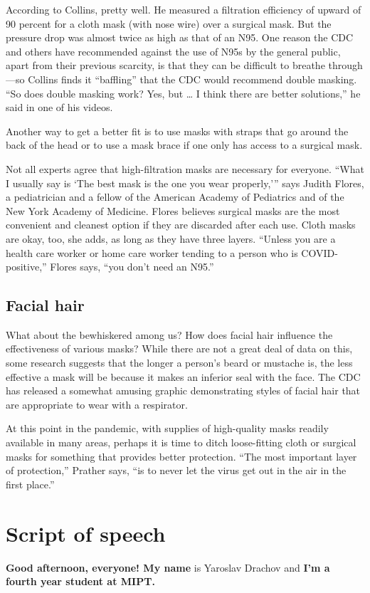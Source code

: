\documentclass[a4paper, 14pt]{extarticle}
\begin{document}
According to Collins, pretty well. He measured a filtration efficiency of upward of 90 percent for a cloth mask (with nose wire) over a surgical mask. But the pressure drop was almost twice as high as that of an N95. One reason the CDC and others have recommended against the use of N95s by the general public, apart from their previous scarcity, is that they can be difficult to breathe through—so Collins finds it “baffling” that the CDC would recommend double masking. “So does double masking work? Yes, but … I think there are better solutions,” he said in one of his videos.

Another way to get a better fit is to use masks with straps that go around the back of the head or to use a mask brace if one only has access to a surgical mask.

Not all experts agree that high-filtration masks are necessary for everyone. “What I usually say is ‘The best mask is the one you wear properly,’” says Judith Flores, a pediatrician and a fellow of the American Academy of Pediatrics and of the New York Academy of Medicine. Flores believes surgical masks are the most convenient and cleanest option if they are discarded after each use. Cloth masks are okay, too, she adds, as long as they have three layers. “Unless you are a health care worker or home care worker tending to a person who is COVID-positive,” Flores says, “you don’t need an N95.”

\subsection*{Facial hair}
What about the bewhiskered among us? How does facial hair influence the effectiveness of various masks? While there are not a great deal of data on this, some research suggests that the longer a person’s beard or mustache is, the less effective a mask will be because it makes an inferior seal with the face. The CDC has released a somewhat amusing graphic demonstrating styles of facial hair that are appropriate to wear with a respirator.

At this point in the pandemic, with supplies of high-quality masks readily available in many areas, perhaps it is time to ditch loose-fitting cloth or surgical masks for something that provides better protection. “The most important layer of protection,” Prather says, “is to never let the virus get out in the air in the first place.”

\section*{Script of speech}
	\noindent \textbf{Good afternoon, everyone! My name} is Yaroslav Drachov and \textbf{I’m a fourth year student at MIPT.}
\end{document}
